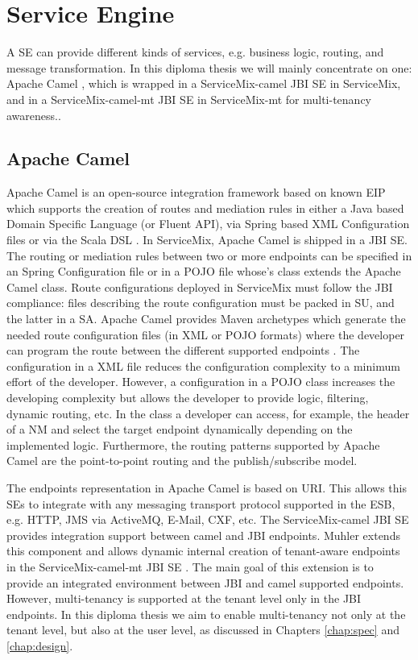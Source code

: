 \section{Service Engine}
\label{sec:serviceengine}  

A \ac{SE} can provide different kinds of services, e.g. business logic, routing, and message transformation. In this diploma thesis we will mainly concentrate on one: Apache Camel \cite{Camel2011}, which is wrapped in a ServiceMix-camel \ac{JBI} \ac{SE} in ServiceMix, and in a ServiceMix-camel-mt \ac{JBI} \ac{SE} in ServiceMix-mt  for multi-tenancy awareness..

\subsection{Apache Camel}

Apache Camel is an open-source integration framework based on known \ac{EIP} which supports the creation of routes and mediation rules in either a Java based Domain Specific Language (or Fluent API), via Spring based XML Configuration files or via the Scala DSL \cite{Camel2011}. In ServiceMix, Apache Camel is shipped in a \ac{JBI} \ac{SE}. The routing or mediation rules between two or more endpoints can be specified in an Spring Configuration file or in a \ac{POJO} file whose's class extends the Apache Camel  class. Route configurations deployed in ServiceMix must follow the \ac{JBI} compliance: files describing the route configuration must be packed in \ac{SU}, and the latter in a \ac{SA}. Apache Camel provides Maven archetypes which generate the needed route configuration files (in \ac{XML} or \ac{POJO} formats) where the developer can program the route between the different supported endpoints \cite{MAVEN}. The configuration in a \ac{XML} file reduces the configuration complexity to a minimum effort of the developer. However, a configuration in a \ac{POJO} class increases the developing complexity but allows the developer to provide logic, filtering, dynamic routing, etc. In the  class a developer can access, for example, the header of a \ac{NM} and select the target endpoint dynamically depending on the implemented logic. Furthermore, the routing patterns supported by Apache Camel are the point-to-point routing and the publish/subscribe model. 

The endpoints representation in Apache Camel is based on \ac{URI}. This allows this \ac{SE}s to integrate with any messaging transport protocol supported in the \ac{ESB}, e.g. \ac{HTTP}, \ac{JMS} via ActiveMQ, E-Mail, CXF, etc. The ServiceMix-camel \ac{JBI} \ac{SE} provides integration support between camel and \ac{JBI} endpoints. Muhler extends this component and allows dynamic internal creation of tenant-aware endpoints in the ServiceMix-camel-mt \ac{JBI} \ac{SE} \cite{Muhler2012}. The main goal of this extension is to provide an integrated environment between \ac{JBI} and camel supported endpoints. However, multi-tenancy is supported at the tenant level only in the \ac{JBI} endpoints. In this diploma thesis we aim to enable multi-tenancy not only at the tenant level, but also at the user level, as discussed in Chapters \ref{chap:spec} and \ref{chap:design}.

